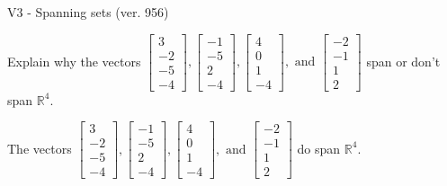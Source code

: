 \begin{exercise}
  \begin{exerciseTitle}V3 - Spanning sets (ver. 956)\end{exerciseTitle}
  \begin{exerciseStatement}
    Explain why the vectors \(\left[\begin{array}{r}
3 \\
-2 \\
-5 \\
-4
\end{array}\right] , \left[\begin{array}{r}
-1 \\
-5 \\
2 \\
-4
\end{array}\right] , \left[\begin{array}{r}
4 \\
0 \\
1 \\
-4
\end{array}\right] , \text{ and } \left[\begin{array}{r}
-2 \\
-1 \\
1 \\
2
\end{array}\right]\) span or don't span \(\mathbb{R}^4\). 
	


  \end{exerciseStatement}
  \begin{exerciseAnswer}
   The vectors \(\left[\begin{array}{r}
3 \\
-2 \\
-5 \\
-4
\end{array}\right] , \left[\begin{array}{r}
-1 \\
-5 \\
2 \\
-4
\end{array}\right] , \left[\begin{array}{r}
4 \\
0 \\
1 \\
-4
\end{array}\right] , \text{ and } \left[\begin{array}{r}
-2 \\
-1 \\
1 \\
2
\end{array}\right]\) 
  	 do  
	span \(\mathbb{R}^4\).
  


  \end{exerciseAnswer}
\end{exercise}